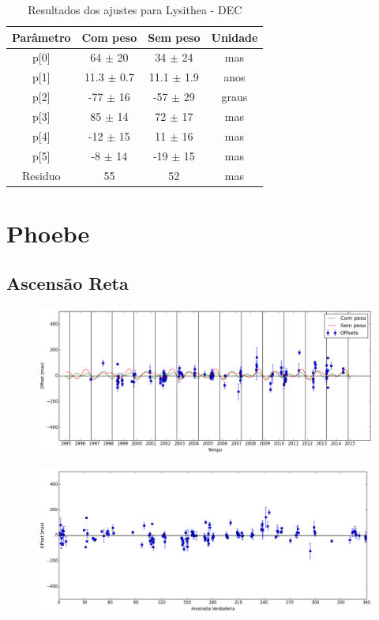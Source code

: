 \documentclass[11pt,a4paper]{report}
\begin{document}
\begin{table}[h!]
\caption{\label{Tab: Lysithea-DEC} Resultados dos ajustes para Lysithea - DEC}
\begin{centering}
\begin{tabular}{cccc}
\hline
\hline
Parâmetro & Com peso & Sem peso & Unidade\tabularnewline
\hline
p[0] & 64 $\pm$ 20 & 34 $\pm$ 24 & mas\\
p[1] & 11.3 $\pm$ 0.7 & 11.1 $\pm$ 1.9 & anos\\
p[2] & -77 $\pm$ 16 & -57 $\pm$ 29 & graus\\
p[3] & 85 $\pm$ 14 & 72 $\pm$ 17 & mas\\
p[4] & -12 $\pm$ 15 & 11 $\pm$ 16 & mas\\
p[5] & -8 $\pm$ 14 & -19 $\pm$ 15 & mas\\
Residuo & 55 & 52 & mas\\
\hline 
\end{tabular} 
\par\end{centering}
\end{table}

\chapter*{Phoebe}
\section*{Ascensão Reta}

\begin{figure}[h]
\includegraphics[scale=0.45]{Phoebe/RA.png} 
\end{figure}

\begin{figure}[h]
\includegraphics[scale=0.45]{Phoebe/RA_anom.png}  
\end{figure}
\end{document}
